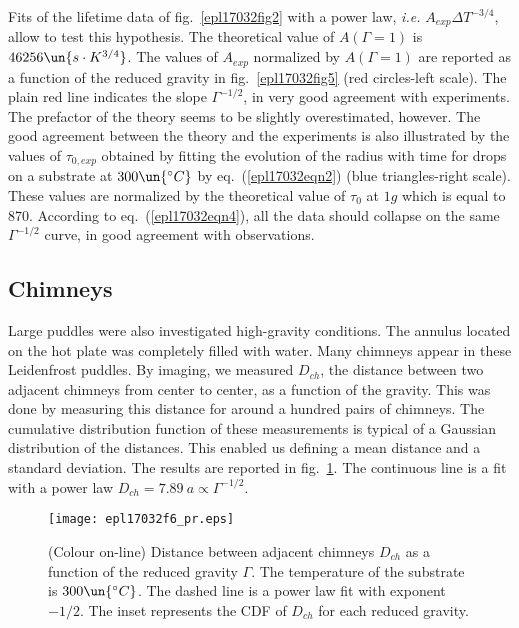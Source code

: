 \documentclass[doublecol,final]{epl2}
\begin{document}
Fits of the lifetime data of fig.~\ref{epl17032fig2} with a power law, \textit{i.e.} $A_{\textit{exp}}\Delta T^{-3/4}$, allow to test this hypothesis. The theoretical value of $A(\Gamma=1)$ is $46256\un{s\cdot K^{3/4}}$. The values of $A_{\textit{exp}}$ normalized by $A(\Gamma=1)$ are reported as a function of the reduced gravity in fig.~\ref{epl17032fig5} (red circles-left scale). The plain red line indicates the slope $\Gamma^{-1/2}$, in very good agreement with experiments. The prefactor of the theory seems to be slightly overestimated, however. The good agreement between the theory and the experiments is also illustrated by the values of $\tau_{0,\textit{exp}}$ obtained by fitting the evolution of the radius with time for drops on a substrate at $300\un{^\circ C}$ by eq.~(\ref{epl17032eqn2}) (blue triangles-right scale). These values are normalized by the theoretical value of $\tau_0$ at $1g$ which is equal to 870. According to eq.~(\ref{epl17032eqn4}), all the data should collapse on the same $\Gamma^{-1/2}$ curve, in good agreement with observations.

\subsection{Chimneys}

Large puddles were also investigated  high-gravity conditions. The annulus located on the hot plate was completely filled with water. Many chimneys appear in these Leidenfrost puddles. By imaging, we measured $D_{ch}$, the distance between two adjacent chimneys from center to center, as a function of the gravity. This was done by measuring this distance for around a hundred pairs of chimneys. The cumulative distribution function of these measurements is typical of a Gaussian distribution of the distances. This enabled us defining a mean distance and a standard deviation. The results are reported in fig.~\ref{epl17032fig6}. The continuous line is a fit with a power law $D_{ch}=7.89\ a \propto \Gamma ^{-1/2}$.

\begin{figure}%
\centering
\texttt{[image: epl17032f6\_pr.eps]}
\caption{(Colour on-line) Distance between adjacent chimneys $D_{ch}$ as a function of the reduced gravity $\Gamma$. The temperature of the substrate is $300\un{^\circ C}$. The dashed line is a power law fit with exponent $-1/2$. The inset represents the CDF of $D_{ch}$ for each reduced gravity.} \label{epl17032fig6}
\end{figure}
\end{document}
